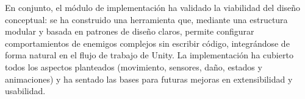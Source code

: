 En conjunto, el módulo de implementación ha validado la viabilidad del diseño conceptual: se ha construido una herramienta que, mediante una estructura modular y basada en patrones de diseño claros, permite configurar comportamientos de enemigos complejos sin escribir código, integrándose de forma natural en el flujo de trabajo de Unity. La implementación ha cubierto todos los aspectos planteados (movimiento, sensores, daño, estados y animaciones) y ha sentado las bases para futuras mejoras en extensibilidad y usabilidad.
